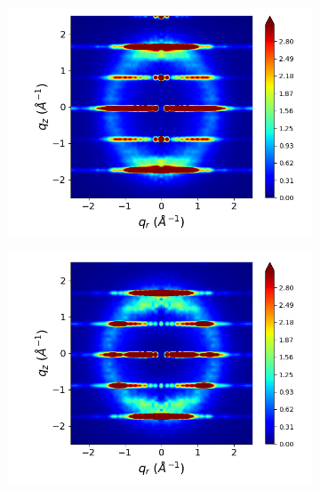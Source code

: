 \documentclass{article}
\begin{document}
\begin{figure}[htb]
\begin{subfigure}{0.3\linewidth}
  	\label{fig:rotated_carboxylate_rzplot_restrained}
  \end{subfigure}
  \begin{subfigure}{0.3\linewidth}
  	\centering
  	\includegraphics[width=\textwidth]{staggered_rzplot_restrained.png}
  	\label{fig:staggered_rzplot_restrained}
  \end{subfigure}
  \begin{subfigure}{0.3\linewidth}
  	\centering
  	\includegraphics[width=\textwidth]{rotated_monomers_rzplot_restrained.png}
  	\label{fig:rotated_monomers_rzplot_restrained}
  \end{subfigure}
  \begin{subfigure}{0.3\linewidth}
  	\centering

\end{subfigure}
\end{figure}
\end{document}
